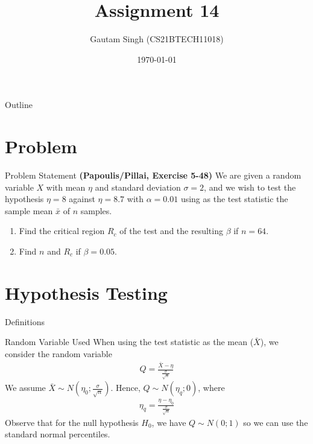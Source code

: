 \documentclass{beamer}
\title{Assignment 14}
\author{Gautam Singh (CS21BTECH11018)}
\date{\today}
\begin{document}
\begin{frame}
    \titlepage 
\end{frame}

\begin{frame}{Outline}
    \tableofcontents
\end{frame}

\section{Problem}
\begin{frame}{Problem Statement}
	\textbf{(Papoulis/Pillai, Exercise 5-48)} We are given a random variable $X$ with mean $\eta$ and standard deviation $\sigma = 2$, and we wish to test the hypothesis $\eta = 8$ against $\eta = 8.7$ with $\alpha = 0.01$ using as the test statistic the sample mean $\bar{x}$ of $n$ samples.
	\begin{enumerate}
		\item Find the critical region $R_c$ of the test and the resulting $\beta$ if $n = 64$. 
		\item Find $n$ and $R_c$ if $\beta = 0.05$.
	\end{enumerate}
\end{frame}

\section{Hypothesis Testing}
\begin{frame}{Definitions}
	\begin{alertblock}{Random Variable Used}
		When using the test statistic as the mean ($\bar{X}$), we consider the random variable
		\begin{align}
			Q = \frac{\bar{X} - \eta}{\frac{\sigma}{\sqrt{n}}}
			\label{eq:Q}
		\end{align}
		We assume $\bar{X} \sim N(\eta_0 ; \frac{\sigma}{\sqrt{n}})$. Hence, $Q \sim N(\eta_q ; 0)$, where
		\begin{align}
			\eta_q = \frac{\eta - \eta_0}{\frac{\sigma}{\sqrt{n}}}
			\label{eq:eta-q}
		\end{align}
		Observe that for the null hypothesis $H_0$, we have $Q \sim N(0; 1)$ so we can use the standard normal percentiles.
	\end{alertblock}
\end{frame}
\end{document}
